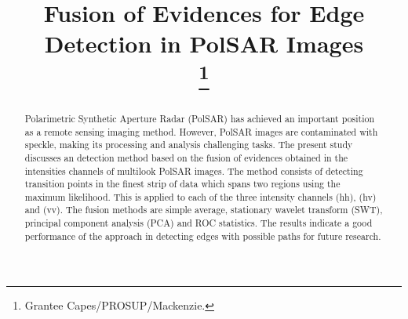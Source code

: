 \documentclass[conference]{IEEEtran}
\begin{document}
\title{Fusion of Evidences for Edge Detection in PolSAR Images\\
\thanks{Grantee Capes/PROSUP/Mackenzie.}
}
\author{
\and
{}
\and
{}
}
\maketitle
\begin{abstract}
Polarimetric Synthetic Aperture Radar (PolSAR) has achieved an important position as a remote sensing imaging method. 
However, PolSAR images are contaminated with speckle, making its processing and analysis challenging tasks. 
The present study discusses an detection method based on the fusion of evidences obtained in the intensities channels of multilook PolSAR images.
The method consists of detecting transition points in the finest strip of data which spans two regions using the maximum likelihood.
This is applied to each of the three intensity channels (hh), (hv) and (vv). 
The fusion methods are simple average, stationary wavelet transform (SWT), principal component analysis (PCA) and ROC statistics.  
The results indicate a good performance of the approach in detecting edges with possible paths for future research.
\end{abstract}
\end{document}
